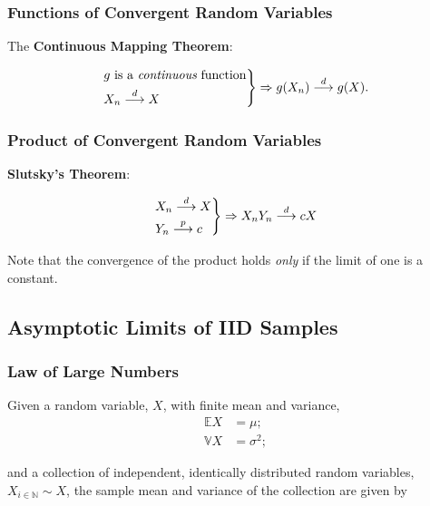 \documentclass[12pt, twoside, draft]{article}
\begin{document}
\subsubsection{Functions of Convergent Random Variables}\label{sec:functions_convergent_random_variables}
The \textbf{Continuous Mapping Theorem}:

\begin{equation}
\begin{rcases}
g \text{  is a }\textit{continuous} \text{ function} \\
X_n \stackrel{d}{\longrightarrow} X
\end{rcases} \Rightarrow
g(X_n) \stackrel{d}{\longrightarrow} g(X).
\end{equation}

\subsubsection{Product of Convergent Random Variables}\label{sec:product_convergent_random_variables}
\textbf{Slutsky's Theorem}\label{sec:Slutskys_theorem}:

\begin{equation}
\begin{rcases}
X_n \stackrel{d}{\longrightarrow} X \\
Y_n \stackrel{p}{\longrightarrow} c
\end{rcases} \Rightarrow
X_nY_n \stackrel{d}{\longrightarrow} cX
\end{equation}

Note that the convergence of the product holds \textit{only} if the limit of one is a constant. 

\subsection{Asymptotic Limits of IID Samples}\label{sec:asymptotic_limits_IID_samples}

\subsubsection{Law of Large Numbers}\label{sec:law_of_large_numbers}
Given a random variable, $X$, with finite mean and variance,
\begin{align}\label{eq:iid_moments}
\mathbb{E}X &= \mu; \\
 \mathbb{V}X &= \sigma^2;
\end{align}

and a collection of independent, identically distributed random variables, $X_{i\in\mathbb{N}} \sim X$, the sample mean and variance of the collection are given by
\end{document}
